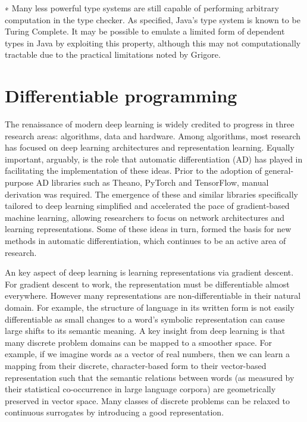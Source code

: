 \documentclass[12pt,initial,twoside,maitrise]{dms}
\numberwithin{equation}{section}
\numberwithin{table}{chapter}
\numberwithin{figure}{chapter}
\begin{document}
∗ Many less powerful type systems are still capable of performing arbitrary computation in the type checker. As specified, Java's type system is known to be Turing Complete. It may be possible to emulate a limited form of dependent types in Java by exploiting this property, although this may not computationally tractable due to the practical limitations noted by Grigore.

\section{Differentiable programming}\label{sec:differentiable-programming}

The renaissance of modern deep learning is widely credited to progress in three research areas: algorithms, data and hardware. Among algorithms, most research has focused on deep learning architectures and representation learning. Equally important, arguably, is the role that automatic differentiation (AD) has played in facilitating the implementation of these ideas. Prior to the adoption of general-purpose AD libraries such as Theano, PyTorch and TensorFlow, manual derivation was required. The emergence of these and similar libraries specifically tailored to deep learning simplified and accelerated the pace of gradient-based machine learning, allowing researchers to focus on network architectures and learning representations. Some of these ideas in turn, formed the basis for new methods in automatic differentiation, which continues to be an active area of research.

An key aspect of deep learning is learning representations via gradient descent. For gradient descent to work, the representation must be differentiable almost everywhere. However many representations are non-differentiable in their natural domain. For example, the structure of language in its written form is not easily differentiable as small changes to a word's symbolic representation can cause large shifts to its semantic meaning. A key insight from deep learning is that many discrete problem domains can be mapped to a smoother space. For example, if we imagine words as a vector of real numbers, then we can learn a mapping from their discrete, character-based form to their vector-based representation such that the semantic relations between words (as measured by their statistical co-occurrence in large language corpora) are geometrically preserved in vector space\cite{pennington2014glove}. Many classes of discrete problems can be relaxed to continuous surrogates by introducing a good representation.
\end{document}
